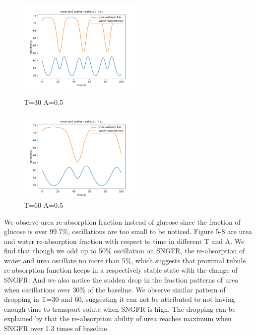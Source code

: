 \documentclass{article}
\begin{document}
\begin{figure}[H]
\centering
\begin{minipage}[t]{0.48\textwidth}
\centering
\includegraphics[width=6cm]{figure/figure7.png}
\caption{T=30 A=0.5}
\end{minipage}
\begin{minipage}[t]{0.48\textwidth}
\centering
\includegraphics[width=6cm]{figure/figure8.png}
\caption{T=60 A=0.5}
\end{minipage}
\end{figure}

We observe urea re-absorption fraction instead of glucose since the fraction of glucose is over 99.7\%, oscillations are too small to be noticed. Figure 5-8 are urea and water re-absorption fraction with respect to time in different T and A. We find that though we add up to 50\% oscillation on SNGFR, the re-absorption of water and urea oscillate no more than 5\%, which suggests that proximal tubule re-absorption function keeps in a respectively stable state with the change of SNGFR. And we also notice the sudden drop in the fraction patterns of urea when oscillations over 30\% of the baseline. We observe similar pattern of dropping in T=30 and 60, suggesting it can not be attributed to not having enough time to transport solute when SNGFR is high. The dropping can be explained by that the re-absorption ability of urea reaches maximum when SNGFR over 1.3 times of baseline. 
\end{document}
